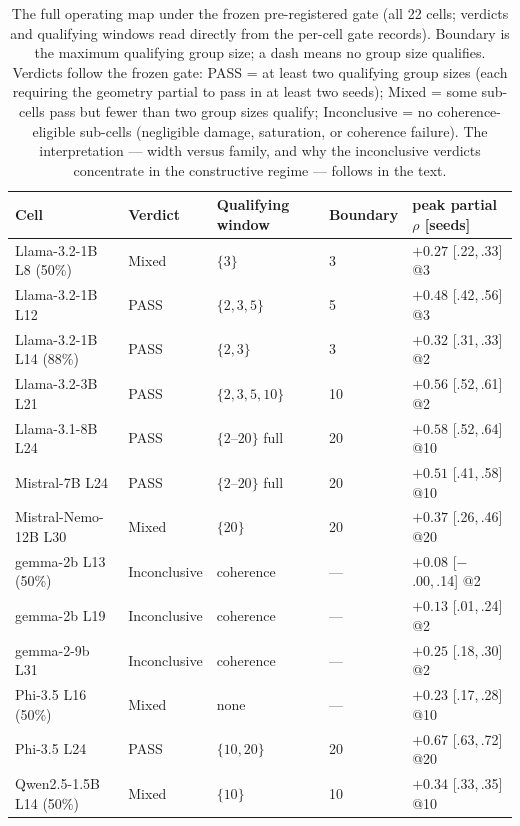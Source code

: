 \documentclass[preprint,12pt]{elsarticle}
\theoremstyle{definition}
\begin{document}
\begin{table}[htbp]
\centering
\caption{The full operating map under the frozen pre-registered gate (all 22 cells;
verdicts and qualifying windows read directly from the per-cell gate records). Boundary
is the maximum qualifying group size; a dash means no group size qualifies. Verdicts
follow the frozen gate: PASS = at least two qualifying group sizes (each requiring the
geometry partial to pass in at least two seeds); Mixed = some sub-cells pass but fewer
than two group sizes qualify; Inconclusive = no coherence-eligible sub-cells (negligible
damage, saturation, or coherence failure). The interpretation --- width versus family,
and why the inconclusive verdicts concentrate in the constructive regime --- follows in
the text.}
\label{tab:width}
{\scriptsize
\setlength{\tabcolsep}{3.5pt}
\begin{tabular}{lllll}
\toprule
Cell & Verdict & Qualifying window & Boundary & peak partial $\rho$ [seeds] \\
\midrule
Llama-3.2-1B L8 (50\%) & Mixed & $\{3\}$ & 3 & $+0.27$ {\scriptsize[.22,\,.33]} @3 \\
Llama-3.2-1B L12 & PASS & $\{2,3,5\}$ & 5 & $+0.48$ {\scriptsize[.42,\,.56]} @3 \\
Llama-3.2-1B L14 (88\%) & PASS & $\{2,3\}$ & 3 & $+0.32$ {\scriptsize[.31,\,.33]} @2 \\
Llama-3.2-3B L21 & PASS & $\{2,3,5,10\}$ & 10 & $+0.56$ {\scriptsize[.52,\,.61]} @2 \\
Llama-3.1-8B L24 & PASS & $\{2\text{--}20\}$ full & 20 & $+0.58$ {\scriptsize[.52,\,.64]} @10 \\
Mistral-7B L24   & PASS & $\{2\text{--}20\}$ full & 20 & $+0.51$ {\scriptsize[.41,\,.58]} @10 \\
Mistral-Nemo-12B L30 & Mixed & $\{20\}$ & 20 & $+0.37$ {\scriptsize[.26,\,.46]} @20 \\
gemma-2b L13 (50\%) & Inconclusive & coherence & --- & $+0.08$ {\scriptsize[$-$.00,\,.14]} @2 \\
gemma-2b L19 & Inconclusive & coherence & --- & $+0.13$ {\scriptsize[.01,\,.24]} @2 \\
gemma-2-9b L31   & Inconclusive & coherence & --- & $+0.25$ {\scriptsize[.18,\,.30]} @2 \\
Phi-3.5 L16 (50\%) & Mixed & none & --- & $+0.23$ {\scriptsize[.17,\,.28]} @10 \\
Phi-3.5 L24 & PASS & $\{10,20\}$ & 20 & $+0.67$ {\scriptsize[.63,\,.72]} @20 \\
Qwen2.5-1.5B L14 (50\%) & Mixed & $\{10\}$ & 10 & $+0.34$ {\scriptsize[.33,\,.35]} @10 \\

\end{tabular}}
\end{table}
\end{document}
